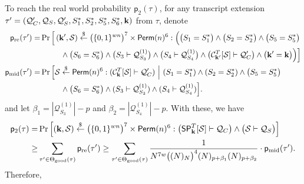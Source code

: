 To reach the real world probability $\mathsf{p}_2(\tau)$, for any transcript extension $\tau'=(\mathcal{Q}_{C}',\mathcal{Q}_{S},\mathcal{Q}_{S}',S_1^*,S_2^*,S_5^*,S_6^*,\mathbf{k})$ from $\tau$, denote            {\small
	\begin{align}
	\mathsf{p}_{\mathrm{re}}(\tau') = & \operatorname{Pr}\Big[\left(\mathbf{k}',\mathcal{S}\right) \stackrel{\$}{\leftarrow} \big(\{0,1\}^{wn}\big)^7 \times \mathsf{Perm}(n)^6:
	\Big(\big(S_1=S_1^*\big)\wedge\big(S_2=S_2^*\big)\wedge\big(S_5=S_5^*\big)		\notag 	\\
	&\ \ \ \ \ \ \ \ \wedge\big(S_6=S_6^*\big)\wedge\big(S_3\vdash\mathcal{Q}_{S_3}^{(1)}\big)\wedge\big(S_4\vdash\mathcal{Q}_{S_4}^{(1)}\big)\wedge\big(\mathcal{C}_{\mathbf{k}'}^T[\mathcal{S}] \vdash \mathcal{Q}_C'\big)\wedge\big(\mathbf{k}'=\mathbf{k}\big)\Big)\Big]	 	\notag 	\\
	\mathsf{p}_{\mathrm{mid}}(\tau') = & \operatorname{Pr}\Big[\mathcal{S} \stackrel{\$}{\leftarrow}\mathsf{Perm}(n)^6:(\mathcal{C}_{\mathbf{k}}^T[\mathcal{S}] \vdash \mathcal{Q}_C')~\Big|~
	(S_1=S_1^*)\wedge (S_2=S_2^*)\wedge\big(S_5=S_5^*\big)	 	\notag 	\\
	&\ \ \ \ \ \ \ \  \wedge\big(S_6=S_6^*\big)\wedge(S_3\vdash\mathcal{Q}_{S_3}^{(1)})\wedge (S_4\vdash\mathcal{Q}_{S_4}^{(1)})\Big].	 	\notag 	
	\end{align}
}%
%
%
and let $\beta_1=|\mathcal{Q}_{S_3}^{(1)}|-p$ and $\beta_2=|\mathcal{Q}_{S_4}^{(1)}|-p$. With these, we have
%
%
\begin{align*}
\mathsf{p}_2(\tau)=&\operatorname{Pr}\left[\left(\mathbf{k},\mathcal{S}\right) \stackrel{\$}{\leftarrow} \big(\{0,1\}^{wn}\big)^7 \times \mathsf{Perm}(n)^6:\big(\spn_{\bfk}^{T}[\mathcal{S}] \vdash \mathcal{Q}_{C}\big) \wedge \big(\mathcal{S} \vdash \mathcal{Q}_{S}\big)\right]		\\
\geq & \sum_{\tau^{\prime} \in \Theta_{\mathrm{good}}(\tau)} \mathsf{p}_{\mathrm{re}}(\tau')  
\geq
\sum_{\tau^{\prime} \in \Theta_{\mathrm{good}}(\tau)}
%
\frac{1}{N^{7w}\big((N)_{N}\big)^4(N)_{p+\beta_1}(N)_{p+\beta_2}}\cdot \mathsf{p}_{\mathrm{mid}}(\tau')  .
\end{align*}
%
%
Therefore,
%
%
